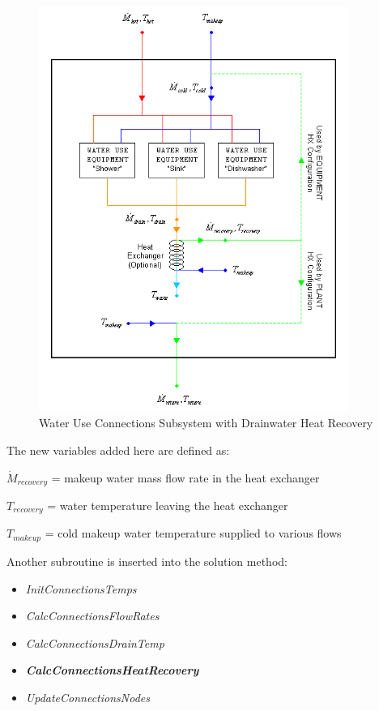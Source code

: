 \begin{figure}[hbtp] %
\centering
\includegraphics[width=0.9\textwidth, height=0.9\textheight, keepaspectratio=true]{media/image7054.png}
\caption{Water Use Connections Subsystem with Drainwater Heat Recovery \protect \label{fig:water-use-connections-subsystem-with}}
\end{figure}

The new variables added here are defined as:

\({\dot M_{recovery}}\) = makeup water mass flow rate in the heat exchanger

\({T_{recovery}}\) = water temperature leaving the heat exchanger

\({T_{makeup}}\) = cold makeup water temperature supplied to various flows

Another subroutine is inserted into the solution method:

\begin{itemize}
\item
  \emph{InitConnectionsTemps}
\item
  \emph{CalcConnectionsFlowRates}
\item
  \emph{CalcConnectionsDrainTemp}
\item
  \textbf{\emph{CalcConnectionsHeatRecovery}}
\item
  \emph{UpdateConnectionsNodes}
\end{itemize}

